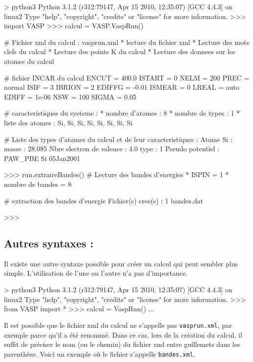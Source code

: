 \documentclass[10pt,a4paper,fleqn]{article}
\begin{document}
\begin{console}
> python3
Python 3.1.2 (r312:79147, Apr 15 2010, 12:35:07) 
[GCC 4.4.3] on linux2
Type "help", "copyright", "credits" or "license" for more information.
>>> import VASP
>>> calcul = VASP.VaspRun()

# Fichier xml du calcul : vasprun.xml
        * lecture du fichier xml
        * Lecture des mots clefs du calcul
        * Lecture des points K du calcul
        * Lecture des donnees sur les atomes du calcul

# fichier INCAR du calcul
     ENCUT = 400.0         ISTART = 0               NELM = 200       
      PREC = normal          ISIF = 3             IBRION = 2         
    EDIFFG = -0.01         ISMEAR = 0              LREAL =  auto     
     EDIFF = 1e-06            NSW = 100            SIGMA = 0.05      

# caracteristiques du systeme :
        * nombre d'atomes  : 8
        * nombre de types  : 1
        * liste des atomes : Si, Si, Si, Si, Si, Si, Si, Si

# Liste des types d'atomes du calcul et de leur caracteristiques :
Atome Si : 
        masse                    : 28.085
        Nbre electron de valence : 4.0
        type                     : 1
        Pseudo potentiel         :  PAW_PBE Si 05Jan2001                   

>>> run.extraireBandes()
# Lecture des bandes d'energies
        * ISPIN            = 1
        * nombre de bandes = 8

# extraction des bandes d'energie
Fichier(s) cree(s) : 1
        bandes.dat

>>>
\end{console}

\subsection{Autres syntaxes :}

Il existe une autre syntaxe possible pour créer un calcul qui peut sembler plus simple.
L'utilisation de l'une ou l'autre n'a pas d'importance.

\begin{console}
> python3
Python 3.1.2 (r312:79147, Apr 15 2010, 12:35:07) 
[GCC 4.4.3] on linux2
Type "help", "copyright", "credits" or "license" for more information.
>>> from VASP import *
>>> calcul = VaspRun()
...
\end{console}

Il est possible que le fichier xml du calcul ne s'appelle pas \verb!vasprun.xml!, par exemple
parce qu'il a été renommé. Dans ce cas, lors de la création du calcul, il suffit de préciser le nom
(ou le chemin) du fichier xml entre guillemets dans les parenthèse. Voici un exemple où le fichier
s'appelle \verb!bandes.xml!.
\end{document}
